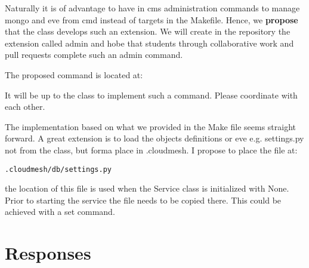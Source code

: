 Naturally it is of advantage to have in cms administration commands to
manage mongo and eve from cmd instead of targets in the Makefile. Hence,
we \textbf{propose} that the class develops such an extension. We will
create in the repository the extension called admin and hobe that
students through collaborative work and pull requests complete such an
admin command.

The proposed command is located at:



It will be up to the class to implement such a command. Please
coordinate with each other.

The implementation based on what we provided in the Make file seems
straight forward. A great extension is to load the objects definitions
or eve e.g. settings.py not from the class, but forma place in
.cloudmesh. I propose to place the file at:

\begin{lstlisting}
.cloudmesh/db/settings.py
\end{lstlisting}

the location of this file is used when the Service class is initialized
with None. Prior to starting the service the file needs to be copied
there. This could be achieved with a set command.

\section{Responses}


